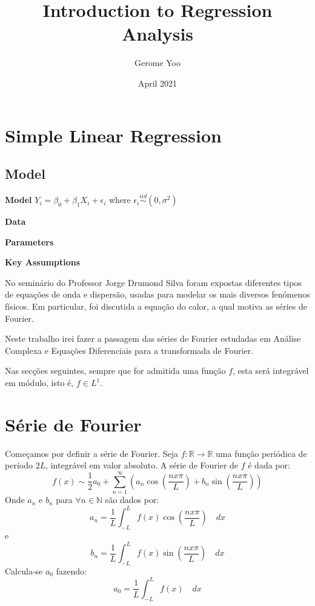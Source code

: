 \documentclass{article}
\title{Introduction to Regression Analysis}
\author{Gerome Yoo}
\date{April 2021}
\begin{document}

\section{Simple Linear Regression}
\subsection{Model}
\textbf{Model} $Y_i = \beta_{0} + \beta_{1} X_{i} + \epsilon_{i}$ where $\epsilon_{i} \overset{iid}{\sim} (0,\sigma^{2})$


\textbf{Data}


\textbf{Parameters}


\textbf{Key Assumptions}

No seminário do Professor Jorge Drumond Silva\cite{drumond} foram expostas diferentes tipos de equações de onda e dispersão, usadas para modelar os mais diversos fenómenos físicos. Em particular, foi discutida a equação do calor, a qual motiva as séries de Fourier.

Neste trabalho irei fazer a passagem das séries de Fourier estudadas em Análise Complexa e Equações Diferenciais para a transformada de Fourier.

Nas secções seguintes, sempre que for admitida uma função \(f\), esta será integrável em módulo, isto é, \(f\in L^1 \).

\section{Série de Fourier}
Começamos por definir a série de Fourier. Seja \(f:\mathbb{R}\rightarrow\mathbb{R}\) uma função periódica de período \(2L\), integrável em valor absoluto. A série de Fourier de \(f\) é dada por:
\[f(x)\sim\frac{1}{2}a_0+ \displaystyle\sum_{n=1}^{\infty}(a_n\cos{(\frac{nx\pi}{L})}+b_n\sin{(\frac{nx\pi}{L})})\]
Onde \(a_n\) e \(b_n\) para \(\forall n \in \mathbb{N}\) são dados por:
\[a_n=\frac{1}{L}\displaystyle\int_{-L}^{L}f(x)\cos{(\frac{nx\pi}{L})}\quad dx\]
e
\[b_n=\frac{1}{L}\displaystyle\int_{-L}^{L}f(x)\sin{(\frac{nx\pi}{L})}\quad dx\]
Calcula-se \(a_0\) fazendo:
\[a_0=\frac{1}{L}\displaystyle\int_{-L}^{L}f(x)\quad dx\]
\end{document}
